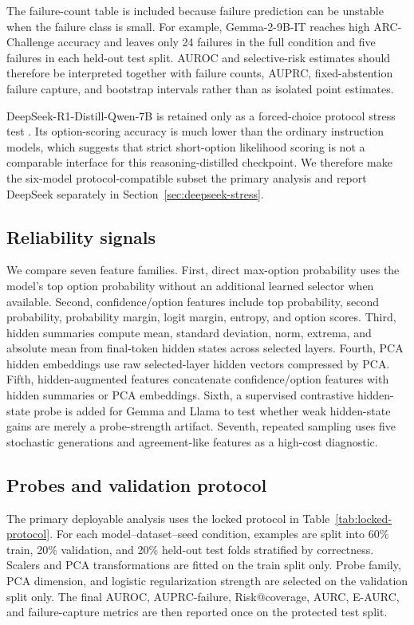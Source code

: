 \documentclass[preprint,12pt,authoryear]{elsarticle}
\begin{document}



The failure-count table is included because failure prediction can be unstable when the failure class is small. For example, Gemma-2-9B-IT reaches high ARC-Challenge accuracy and leaves only 24 failures in the full condition and five failures in each held-out test split. AUROC and selective-risk estimates should therefore be interpreted together with failure counts, AUPRC, fixed-abstention failure capture, and bootstrap intervals rather than as isolated point estimates.

DeepSeek-R1-Distill-Qwen-7B is retained only as a forced-choice protocol stress test \citep{deepseek2025r1}. Its option-scoring accuracy is much lower than the ordinary instruction models, which suggests that strict short-option likelihood scoring is not a comparable interface for this reasoning-distilled checkpoint. We therefore make the six-model protocol-compatible subset the primary analysis and report DeepSeek separately in Section~\ref{sec:deepseek-stress}.

\subsection{Reliability signals}
We compare seven feature families. First, direct max-option probability uses the model's top option probability without an additional learned selector when available. Second, confidence/option features include top probability, second probability, probability margin, logit margin, entropy, and option scores. Third, hidden summaries compute mean, standard deviation, norm, extrema, and absolute mean from final-token hidden states across selected layers. Fourth, PCA hidden embeddings use raw selected-layer hidden vectors compressed by PCA. Fifth, hidden-augmented features concatenate confidence/option features with hidden summaries or PCA embeddings. Sixth, a supervised contrastive hidden-state probe is added for Gemma and Llama to test whether weak hidden-state gains are merely a probe-strength artifact. Seventh, repeated sampling uses five stochastic generations and agreement-like features as a high-cost diagnostic.

\subsection{Probes and validation protocol}
The primary deployable analysis uses the locked protocol in Table~\ref{tab:locked-protocol}. For each model--dataset--seed condition, examples are split into 60\% train, 20\% validation, and 20\% held-out test folds stratified by correctness. Scalers and PCA transformations are fitted on the train split only. Probe family, PCA dimension, and logistic regularization strength are selected on the validation split only. The final AUROC, AUPRC-failure, Risk@coverage, AURC, E-AURC, and failure-capture metrics are then reported once on the protected test split.
\end{document}
